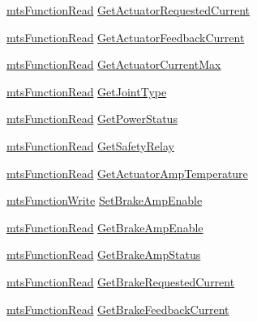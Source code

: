 \begin{DoxyCompactItemize}
\item 
\hyperlink{classmts_function_read}{mts\-Function\-Read} \hyperlink{structmts_robot_i_o1394_qt_widget_1_1_robot_struct_a4ccb02353fa96d91326391a595da27f1}{Get\-Actuator\-Requested\-Current}
\item 
\hyperlink{classmts_function_read}{mts\-Function\-Read} \hyperlink{structmts_robot_i_o1394_qt_widget_1_1_robot_struct_a8c773e48b0677c73fd1532e5c2741503}{Get\-Actuator\-Feedback\-Current}
\item 
\hyperlink{classmts_function_read}{mts\-Function\-Read} \hyperlink{structmts_robot_i_o1394_qt_widget_1_1_robot_struct_a689285f24e9c4096619842be465b1323}{Get\-Actuator\-Current\-Max}
\item 
\hyperlink{classmts_function_read}{mts\-Function\-Read} \hyperlink{structmts_robot_i_o1394_qt_widget_1_1_robot_struct_ac0aad3722e34e0dcde09022a09a754ac}{Get\-Joint\-Type}
\item 
\hyperlink{classmts_function_read}{mts\-Function\-Read} \hyperlink{structmts_robot_i_o1394_qt_widget_1_1_robot_struct_a60b44e1e41d496937ea025c512c512fb}{Get\-Power\-Status}
\item 
\hyperlink{classmts_function_read}{mts\-Function\-Read} \hyperlink{structmts_robot_i_o1394_qt_widget_1_1_robot_struct_a134a6439726e8afe32fba42603249fff}{Get\-Safety\-Relay}
\item 
\hyperlink{classmts_function_read}{mts\-Function\-Read} \hyperlink{structmts_robot_i_o1394_qt_widget_1_1_robot_struct_a9bc640e0bebd11be3d4c68073b7e44f6}{Get\-Actuator\-Amp\-Temperature}
\item 
\hyperlink{classmts_function_write}{mts\-Function\-Write} \hyperlink{structmts_robot_i_o1394_qt_widget_1_1_robot_struct_ad417df4f69d6495b513bab95282c5d1c}{Set\-Brake\-Amp\-Enable}
\item 
\hyperlink{classmts_function_read}{mts\-Function\-Read} \hyperlink{structmts_robot_i_o1394_qt_widget_1_1_robot_struct_a7e28f52f68f9a30e33438867d39c0253}{Get\-Brake\-Amp\-Enable}
\item 
\hyperlink{classmts_function_read}{mts\-Function\-Read} \hyperlink{structmts_robot_i_o1394_qt_widget_1_1_robot_struct_a9b1c8db686bd9e22c2f3e265cfff5ea9}{Get\-Brake\-Amp\-Status}
\item 
\hyperlink{classmts_function_read}{mts\-Function\-Read} \hyperlink{structmts_robot_i_o1394_qt_widget_1_1_robot_struct_a146b0df0258f6c9115412710c0452d71}{Get\-Brake\-Requested\-Current}
\item 
\hyperlink{classmts_function_read}{mts\-Function\-Read} \hyperlink{structmts_robot_i_o1394_qt_widget_1_1_robot_struct_a86d4ca78e3c09b3ccba249bb2f0e98a1}{Get\-Brake\-Feedback\-Current}

\end{DoxyCompactItemize}
